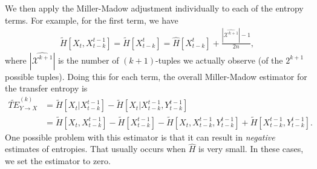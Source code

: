 	We then apply the Miller-Madow adjustment individually to each of the entropy terms. For example, for the first term, we have
	\begin{align}
		\tilde{H}[X_{t}, X_{t - k}^{t-1}] = \tilde{H}[X_{t - k}^{t}] = \hat{H}[X_{t-k}^{t}] + \frac{|\widehat{\mathcal{X}^{k+1}}| - 1}{2n},
	\end{align}
	where $|\widehat{\mathcal{X}^{k+1}}|$ is the number of $(k + 1)$-tuples we actually observe (of the $2^{k + 1}$ possible tuples). Doing this for each term, the overall Miller-Madow estimator for the transfer entropy is
	\begin{align}
		\widetilde{TE}_{Y \to X}^{(k)} &= \tilde{H}[X_t | X_{t-k}^{t-1}] - \tilde{H}[X_t | X_{t-k}^{t-1},Y_{t-k}^{t-1}] \\ 
		&= \tilde{H}[X_t,X_{t-k}^{t-1}]-\tilde{H}[X_{t-k}^{t-1}]-\tilde{H}[X_t,X_{t-k}^{t-1},Y_{t-k}^{t-1}]+\tilde{H}[X_{t-k}^{t-1},Y_{t-k}^{t-1}].
	\end{align}
	One possible problem with this estimator is that it can result in \emph{negative} estimates of entropies. That usually occurs when $\hat{H}$ is very small. In these cases, we set the estimator to zero.


